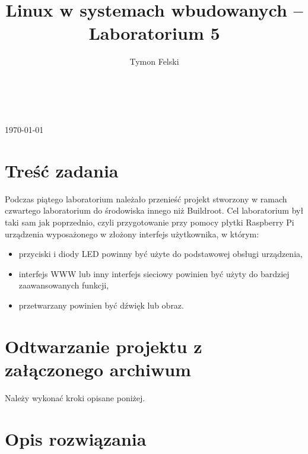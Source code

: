 \documentclass[10pt,a4paper]{article}
\title{Linux w systemach wbudowanych -- Laboratorium 5}
\author{Tymon Felski}
\begin{document}
\makeatletter
\begin{center}
	\LARGE{\@title}\\
	\vspace{.4cm}
	\Large{\@author}\\
	\vspace{.2cm}
	\large{\today}
\end{center}
\makeatother

\section{Treść zadania}
Podczas piątego laboratorium należało przenieść projekt stworzony w ramach czwartego laboratorium do środowiska innego niż Buildroot. Cel laboratorium był taki sam jak poprzednio, czyli przygotowanie przy pomocy płytki Raspberry Pi urządzenia wyposażonego w złożony interfejs użytkownika, w którym:
\begin{itemize}
	\item przyciski i diody LED powinny być użyte do podstawowej obsługi urządzenia,
	\item interfejs WWW lub inny interfejs sieciowy powinien być użyty do bardziej zaawansowanych funkcji,
	\item przetwarzany powinien być dźwięk lub obraz.
\end{itemize}

\section{Odtwarzanie projektu z załączonego archiwum}
Należy wykonać kroki opisane poniżej.

\section{Opis rozwiązania}
\end{document}
